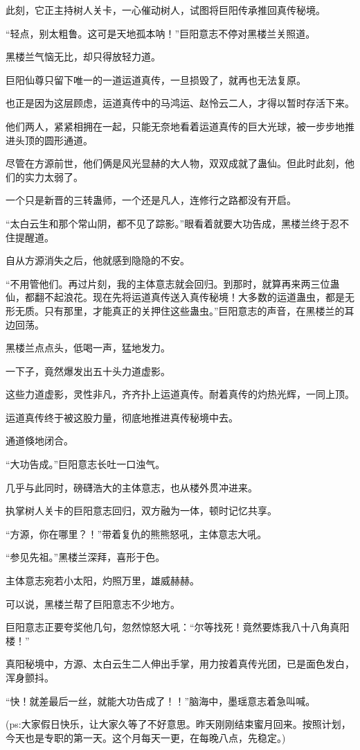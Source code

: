 \begin{this_body}
此刻，它正主持树人关卡，一心催动树人，试图将巨阳传承推回真传秘境。

“轻点，别太粗鲁。这可是天地孤本呐！”巨阳意志不停对黑楼兰关照道。

黑楼兰气恼无比，却只得放轻力道。

巨阳仙尊只留下唯一的一道运道真传，一旦损毁了，就再也无法复原。

也正是因为这层顾虑，运道真传中的马鸿运、赵怜云二人，才得以暂时存活下来。

他们两人，紧紧相拥在一起，只能无奈地看着运道真传的巨大光球，被一步步地推进头顶的圆形通道。

尽管在方源前世，他们俩是风光显赫的大人物，双双成就了蛊仙。但此时此刻，他们的实力太弱了。

一个只是新晋的三转蛊师，一个还是凡人，连修行之路都没有开启。

“太白云生和那个常山阴，都不见了踪影。”眼看着就要大功告成，黑楼兰终于忍不住提醒道。

自从方源消失之后，他就感到隐隐的不安。

“不用管他们。再过片刻，我的主体意志就会回归。到那时，就算再来两三位蛊仙，都翻不起浪花。现在先将运道真传送入真传秘境！大多数的运道蛊虫，都是无形无质。只有那里，才能真正的关押住这些蛊虫。”巨阳意志的声音，在黑楼兰的耳边回荡。

黑楼兰点点头，低喝一声，猛地发力。

一下子，竟然爆发出五十头力道虚影。

这些力道虚影，灵性非凡，齐齐扑上运道真传。耐着真传的灼热光辉，一同上顶。

运道真传终于被这股力量，彻底地推进真传秘境中去。

通道倏地闭合。

“大功告成。”巨阳意志长吐一口浊气。

几乎与此同时，磅礴浩大的主体意志，也从楼外贯冲进来。

执掌树人关卡的巨阳意志回归，双方融为一体，顿时记忆共享。

“方源，你在哪里？！”带着复仇的熊熊怒吼，主体意志大吼。

“参见先祖。”黑楼兰深拜，喜形于色。

主体意志宛若小太阳，灼照万里，雄威赫赫。

可以说，黑楼兰帮了巨阳意志不少地方。

巨阳意志正要夸奖他几句，忽然惊怒大吼：“尔等找死！竟然要炼我八十八角真阳楼！”

真阳秘境中，方源、太白云生二人伸出手掌，用力按着真传光团，已是面色发白，浑身颤抖。

“快！就差最后一丝，就能大功告成了！！”脑海中，墨瑶意志着急叫喊。

(ps:大家假日快乐，让大家久等了不好意思。昨天刚刚结束蜜月回来。按照计划，今天也是专职的第一天。这个月每天一更，在每晚八点，先稳定。)

\end{this_body}

